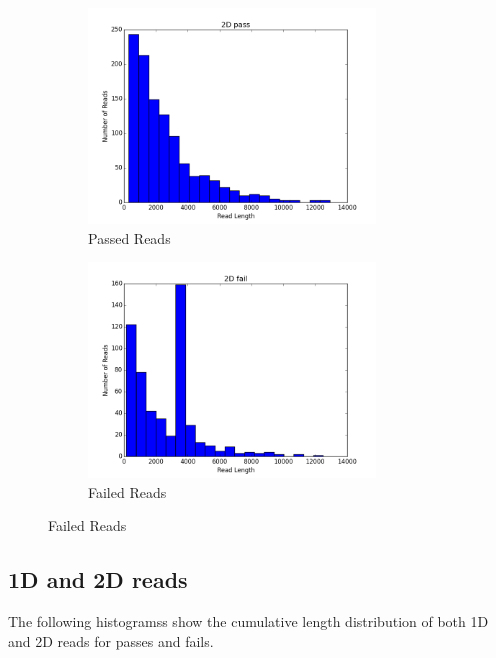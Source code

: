\documentclass[11pt]{article}
\begin{document}
        \begin{figure}[h!]
		\begin{subfigure}[b]{0.45\textwidth}
    			\includegraphics[width=3in]{2Dpasses}
    			\caption{Passed Reads}
  		\end{subfigure}
  		\begin{subfigure}[b]{0.45\textwidth}
    			\includegraphics[width=3in]{2Dfailures}
    			\caption{Failed Reads}
  		\end{subfigure}
	\end{figure}

        
\subsection*{1D and 2D reads}

        The following histogramss show the cumulative length distribution of both 1D and 2D reads for passes and fails.
\end{document}

